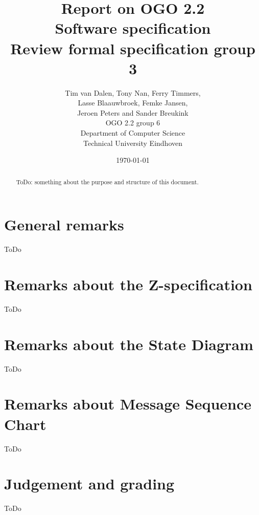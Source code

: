 \documentclass[a4paper,11pt]{article}
\title{Report on OGO 2.2 \\ Software specification\\ Review formal specification group 3}
\author{
        Tim van Dalen, Tony Nan, Ferry Timmers, \\ Lasse Blaauwbroek, Femke Jansen, \\Jeroen Peters and Sander Breukink\\ OGO 2.2 group 6 \\
                Department of Computer Science\\
        Technical University Eindhoven\\
}
\date{\today}
\begin{document}
\maketitle

\begin{abstract}
ToDo: something about the purpose and structure of this document.
\end{abstract}

\newpage
	
	\tableofcontents
	\newpage
	
	\section{General remarks}
    ToDo
	
	\section{Remarks about the Z-specification}
    ToDo

	\section{Remarks about the State Diagram}
    ToDo

    \section{Remarks about Message Sequence Chart}
    ToDo
    
    \section{Judgement and grading}
    ToDo
\end{document}
